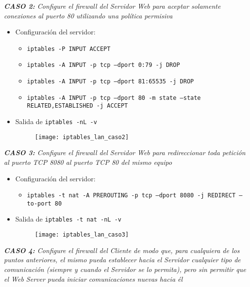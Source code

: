 \emph{\textbf{CASO 2:} Configure el firewall del Servidor Web para aceptar solamente conexiones al puerto 80 utilizando una política permisiva} 
~\\

\begin{itemize}
    \item Configuración del servidor:
    \begin{itemize}
        \item \texttt{iptables -P INPUT ACCEPT} 
        \item \texttt{iptables -A INPUT -p tcp --dport 0:79 -j DROP} 
        \item \texttt{iptables -A INPUT -p tcp --dport 81:65535 -j DROP} 
        \item \texttt{iptables -A INPUT -p tcp --dport 80 -m state --state RELATED,ESTABLISHED -j ACCEPT} 
    \end{itemize}
    \item Salida de \texttt{iptables -nL -v} 
    \begin{figure}[H]
        \centering
        \texttt{[image: iptables\_lan\_caso2]}
    \end{figure}
\end{itemize}

\emph{\textbf{CASO 3:} Configure el firewall del Servidor Web para redireccionar toda petición al puerto TCP 8080 al puerto TCP 80 del mismo equipo} 
~\\

\begin{itemize}
    \item Configuración del servidor:
    \begin{itemize}
        \item \texttt{iptables -t nat -A PREROUTING -p tcp --dport 8080 -j REDIRECT --to-port 80} 
    \end{itemize}
    \item Salida de \texttt{iptables -t nat -nL -v} 
    \begin{figure}[H]
        \centering
        \texttt{[image: iptables\_lan\_caso3]}
    \end{figure}
\end{itemize}

\emph{\textbf{CASO 4:} Configure el firewall del Cliente de modo que, para cualquiera de los puntos anteriores, el mismo pueda establecer hacia el Servidor cualquier tipo de comunicación (siempre y cuando el Servidor se lo permita), pero sin permitir que el Web Server pueda iniciar comunicaciones nuevas hacia él} 
~\\

